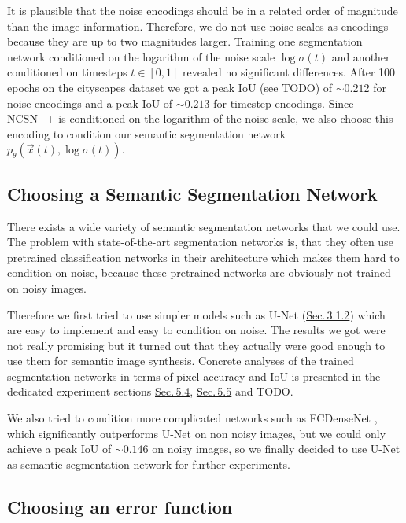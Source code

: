 It is plausible that the noise encodings should be in a related order of magnitude than the image information. Therefore, we do not use noise scales as encodings because they are up to two magnitudes larger. Training one segmentation network conditioned on the logarithm of the noise scale $\log \sigma(t)$ and another conditioned on timesteps $t\in[0,1]$ revealed no significant differences. After 100 epochs on the cityscapes dataset we got a peak IoU (see TODO) of $\sim0.212$ for noise encodings and a peak IoU of $\sim0.213$ for timestep encodings. Since NCSN++ is conditioned on the logarithm of the noise scale, we also choose this encoding to condition our semantic segmentation network $p_\theta(\vec{x}(t), \log \sigma(t))$.

\subsection{Choosing a Semantic Segmentation Network}

There exists a wide variety of semantic segmentation networks that we could use. The problem with state-of-the-art segmentation networks is, that they often use pretrained classification networks in their architecture which makes them hard to condition on noise, because these pretrained networks are obviously not trained on noisy images. 

Therefore we first tried to use simpler models such as U-Net (\hyperref[sec:3.1.2]{Sec.\,3.1.2}) which are easy to implement and easy to condition on noise. The results we got were not really promising but it turned out that they actually were good enough to use them for semantic image synthesis. Concrete analyses of the trained segmentation networks in terms of pixel accuracy and IoU is presented in the dedicated experiment sections \hyperref[sec:5.4]{Sec.\,5.4}, \hyperref[sec:5.5]{Sec.\,5.5} and TODO.

We also tried to condition more complicated networks such as FCDenseNet \cite{densenet}, which significantly outperforms U-Net on non noisy images, but we could only achieve a peak IoU of $\sim0.146$ on noisy images, so we finally decided to use U-Net as semantic segmentation network for further experiments.

\subsection{Choosing an error function}

